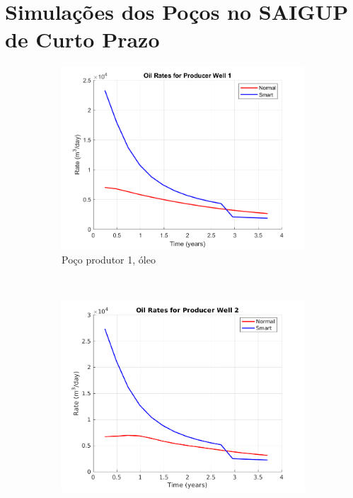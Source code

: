 \chapter{Simula\c{c}\~{o}es dos Po\c{c}os no SAIGUP de Curto Prazo}
\begin{figure}[!ht]
	\centering
	\begin{subfigure}[b]{.3\textwidth}
		\includegraphics[width=\textwidth]{figs/resultadosSSAIGUP/SSAIGUP_OilWell1_Zoom}
		\caption{Po\c{c}o produtor 1, \'{o}leo}
		\label{SSAIGUP_OilWell1}
	\end{subfigure}
	~
	\begin{subfigure}[b]{.3\textwidth}
		\includegraphics[width=\textwidth]{figs/resultadosSSAIGUP/SSAIGUP_OilWell2_Zoom}

\end{subfigure}
\end{figure}
